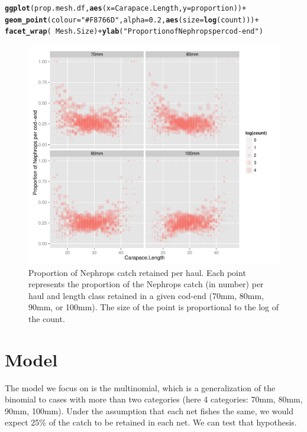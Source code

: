 \documentclass[12pt]{article}\usepackage[]{graphicx}\usepackage[]{color}
\makeatletter
\def\maxwidth{ %
  \ifdim\Gin@nat@width>\linewidth
    \linewidth
  \else
    \Gin@nat@width
  \fi
}
\newcommand{\hlnum}[1]{\textcolor[rgb]{0.686,0.059,0.569}{#1}}%
\newcommand{\hlstr}[1]{\textcolor[rgb]{0.192,0.494,0.8}{#1}}%
\newcommand{\hlopt}[1]{\textcolor[rgb]{0,0,0}{#1}}%
\newcommand{\hlstd}[1]{\textcolor[rgb]{0.345,0.345,0.345}{#1}}%
\newcommand{\hlkwc}[1]{\textcolor[rgb]{0.333,0.667,0.333}{#1}}%
\newcommand{\hlkwd}[1]{\textcolor[rgb]{0.737,0.353,0.396}{\textbf{#1}}}%
\newenvironment{kframe}{%
 \def\at@end@of@kframe{}%
 \ifinner\ifhmode%
  \def\at@end@of@kframe{\end{minipage}}%
  \begin{minipage}{\columnwidth}%
 \fi\fi%
 \def\FrameCommand##1{\hskip\@totalleftmargin \hskip-\fboxsep
 \colorbox{shadecolor}{##1}\hskip-\fboxsep
     \hskip-\linewidth \hskip-\@totalleftmargin \hskip\columnwidth}%
 \MakeFramed {\advance\hsize-\width
   \@totalleftmargin\z@ \linewidth\hsize
   \@setminipage}}%
 {\par\unskip\endMakeFramed%
 \at@end@of@kframe}
\newenvironment{knitrout}{}{} %
\makeatother
\begin{document}
\begin{knitrout}
\begin{kframe}
\begin{alltt}
\hlkwd{ggplot}\hlstd{(prop.mesh.df,} \hlkwd{aes}\hlstd{(}\hlkwc{x} \hlstd{= Carapace.Length,} \hlkwc{y} \hlstd{= proportion))} \hlopt{+}
  \hlkwd{geom_point}\hlstd{(}\hlkwc{colour} \hlstd{=} \hlstr{"#F8766D"}\hlstd{,} \hlkwc{alpha} \hlstd{=} \hlnum{0.2}\hlstd{,} \hlkwd{aes}\hlstd{(}\hlkwc{size} \hlstd{=} \hlkwd{log}\hlstd{(count)))} \hlopt{+}
  \hlkwd{facet_wrap}\hlstd{(}\hlopt{~} \hlstd{Mesh.Size)} \hlopt{+} \hlkwd{ylab}\hlstd{(}\hlstr{"Proportion of Nephrops per cod-end"}\hlstd{)}
\end{alltt}
\end{kframe}\begin{figure}
\includegraphics[width=\maxwidth]{figure/unnamed-chunk-4-1} \caption[Proportion of Nephrops catch retained per haul]{Proportion of Nephrops catch retained per haul. Each point represents the proportion of the Nephrops catch (in number) per haul and length class retained in a given cod-end (70mm, 80mm, 90mm, or 100mm). The size of the point is proportional to the log of the count.}\label{fig:unnamed-chunk-4}
\end{figure}


\end{knitrout}

\section{Model}
The model we focus on is the multinomial, which is a generalization of the binomial to cases with more than two categories (here 4 categories: 70mm, 80mm, 90mm, 100mm). Under the assumption that each net fishes the same, we would expect 25\% of the catch to be retained in each net. We can test that hypothesis.
\end{document}
